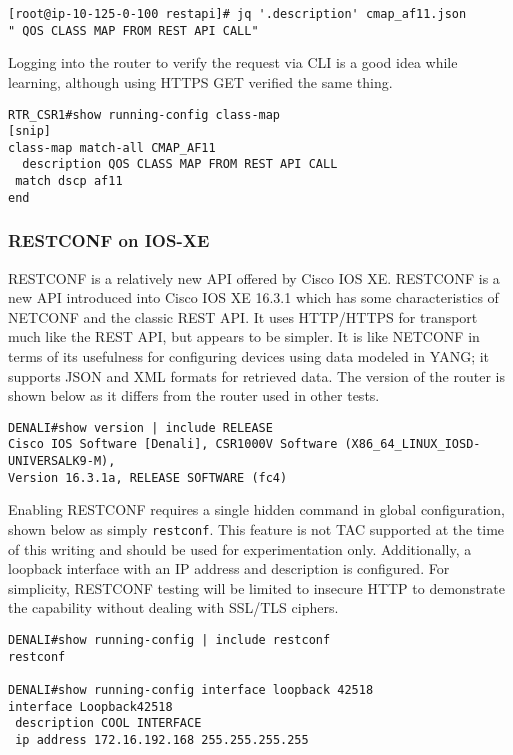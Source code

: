 \begin{verbatim}
[root@ip-10-125-0-100 restapi]# jq '.description' cmap_af11.json 
" QOS CLASS MAP FROM REST API CALL"
\end{verbatim}

Logging into the router to verify the request via CLI is a good idea while
learning, although using HTTPS GET verified the same thing.

\begin{verbatim}
RTR_CSR1#show running-config class-map
[snip]
class-map match-all CMAP_AF11
  description QOS CLASS MAP FROM REST API CALL
 match dscp af11 
end
\end{verbatim}

\subsubsection{RESTCONF on IOS-XE}
RESTCONF is a relatively new API offered by Cisco IOS XE. RESTCONF is a new
API introduced into Cisco IOS XE 16.3.1 which has some characteristics of
NETCONF and the classic REST API. It uses HTTP/HTTPS for transport much like
the REST API, but appears to be simpler. It is like NETCONF in terms of its
usefulness for configuring devices using data modeled in YANG; it supports
JSON and XML formats for retrieved data. The version of the router is shown
below as it differs from the router used in other tests.

\begin{verbatim}
DENALI#show version | include RELEASE
Cisco IOS Software [Denali], CSR1000V Software (X86_64_LINUX_IOSD-UNIVERSALK9-M),
Version 16.3.1a, RELEASE SOFTWARE (fc4)
\end{verbatim}

Enabling RESTCONF requires a single hidden command in global configuration,
shown below as simply \verb|restconf|. This feature is not TAC supported at
the time of this writing and should be used for experimentation only.
Additionally, a loopback interface with an IP address and description is
configured. For simplicity, RESTCONF testing will be limited to insecure HTTP
to demonstrate the capability without dealing with SSL/TLS ciphers.

\begin{verbatim}
DENALI#show running-config | include restconf
restconf

DENALI#show running-config interface loopback 42518
interface Loopback42518
 description COOL INTERFACE
 ip address 172.16.192.168 255.255.255.255
\end{verbatim}

